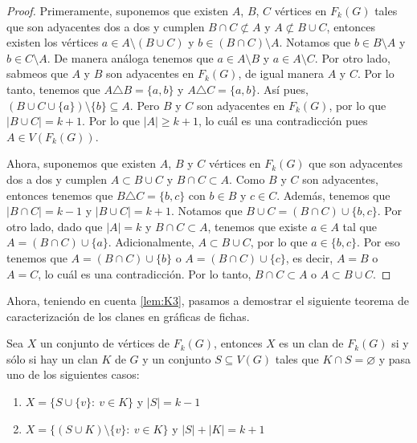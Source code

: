 \begin{proof}
    Primeramente, suponemos que existen $A$, $B$, $C$ v\'ertices en $F_k(G)$
    tales que son adyacentes dos a dos y cumplen $B \cap C \not\subset A$ y $A
    \not\subset B \cup C$, entonces existen los v\'ertices  $a \in A \setminus
    (B \cup C)$ y $b \in (B \cap C)\setminus A$. Notamos que $b \in B \setminus
    A$ y $b \in C \setminus A$. De manera an\'aloga tenemos que $a \in A
    \setminus B$ y $a \in A \setminus C$. Por otro lado, sabmeos que $A$ y $B$
    son adyacentes en $F_k(G)$, de igual manera $A$ y $C$. Por lo tanto, tenemos
    que $A \triangle B = \{a,b\}$ y $A \triangle C = \{a, b\}$. As\'i pues, $(B
    \cup C \cup \{a\})\setminus \{b\} \subseteq A$. Pero $B$ y $C$ son
    adyacentes en $F_k(G)$, por lo que $|B \cup C| = k+1$. Por lo que $|A| \geq
    k+1$, lo cu\'al es una contradicci\'on pues $A \in V (F_k(G))$. 

    Ahora, suponemos que existen $A$, $B$ y $C$ v\'ertices en $F_k(G)$ que son
    adyacentes dos a dos y cumplen $A \subset B \cup C$ y $B \cap C \subset A$.
    Como $B$ y $C$ son adyacentes, entonces tenemos que $B \triangle C =
    \{b,c\}$ con $b \in B$ y $c \in C$. Adem\'as, tenemos que $|B \cap C| = k-1$
    y $|B \cup C| = k +1$. Notamos que $B \cup C = (B\cap C) \cup \{b,c\}$. Por
    otro lado, dado que $|A|=k$ y $B \cap C \subset A$, tenemos que existe $a
    \in A$ tal que $A = (B \cap C) \cup \{a\}$. Adicionalmente, $A \subset B
    \cup C$, por lo que $a \in \{b, c\}$. Por eso tenemos que $A = (B \cap C)
    \cup \{b\}$ o $A = (B \cap C) \cup \{c\}$, es decir, $A = B$ o $A=C$, lo
    cu\'al es una contradicci\'on. Por lo tanto, $B \cap C \subset
    A$ o $A \subset B \cup C$.
\end{proof}

Ahora, teniendo en cuenta \cref{lem:K3}, pasamos a demostrar el siguiente
teorema de caracterizaci\'on de los clanes en gr\'aficas de fichas.

\begin{teorema}
\label{teo:clanG-clanFG}
    Sea $X$ un conjunto de v\'ertices de $F_k(G)$, entonces $X$ es un clan de
    $F_k(G)$ si y s\'olo si hay un clan $K$ de $G$ y un conjunto $S \subseteq
    V(G)$ tales que $K \cap S = \varnothing$ y pasa uno de los siguientes casos:
        \begin{enumerate}
            \item $X = \{S \cup \{v\}\colon\ v \in K\}$ y $|S| = k-1$
            \item $X = \{(S\cup K) \setminus \{v\}\colon\ v \in K \}$ y $|S| +
            |K| = k+1$
        \end{enumerate}
\end{teorema}


